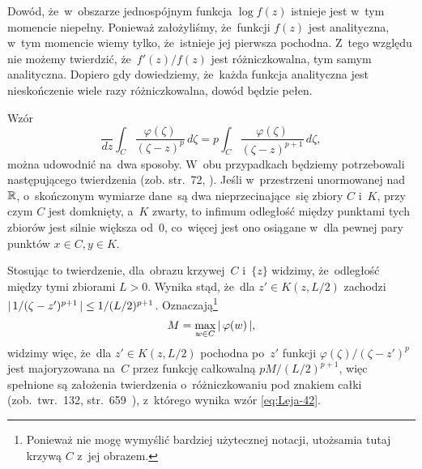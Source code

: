 \documentclass[a4paper,11pt]{article}
\begin{document}
\vspace{\spaceFour}



\start {} Dowód, że~w~obszarze jednospójnym funkcja
$\log f( z )$ istnieje jest w~tym momencie niepełny. Ponieważ
założyliśmy, że~funkcji $f( z )$ jest analityczna, w~tym momencie
wiemy tylko, że~istnieje jej pierwsza pochodna. Z~tego względu nie
możemy twierdzić, że~$f'( z ) / f( z )$ jest różniczkowalna, tym samym
analityczna. Dopiero gdy dowiedziemy, że~każda funkcja analityczna
jest nieskończenie wiele razy różniczkowalna, dowód będzie pełen.

\vspace{\spaceFour}



\start {} Wzór
\begin{equation}
  \label{eq:Leja-41}
  \frac{ }{ dz } \int_{ C } \frac{ \varphi( \zeta ) }{ ( \zeta - z )^{ p } } \, d\zeta
  = p \int_{ C } \frac{ \varphi( \zeta ) }{ ( \zeta - z )^{ p + 1 } } \, d\zeta,
\end{equation}
można udowodnić na~dwa sposoby. W~obu przypadkach będziemy
potrzebowali następującego twierdzenia (zob. str.~72,
\cite{SchwartzKursAnalizyMatematycznejVolI1979}). Jeśli w~przestrzeni
unormowanej nad~$\mathbb{R}$, o~skończonym wymiarze dane~są dwa
nieprzecinające~się zbiory $C$ i~$K$, przy czym $C$ jest domknięty,
a~$K$ zwarty, to infimum odległość między punktami tych zbiorów jest
silnie większa od~$0$, co~więcej jest ono osiągane w~dla pewnej pary
punktów $x \in C, y \in K$.

Stosując to twierdzenie, dla~obrazu krzywej~$C$ i~$\{ z \}$ widzimy,
że~odległość między tymi zbiorami $L > 0$. Wynika stąd, że~dla
$z' \in K( z, L / 2 )$ zachodzi
$|\, {  1 / ( \zeta - z' )^{ p + 1 }  } \,| \leq 1 / ( L / 2 )^{ p + 1 }$.
Oznaczają\footnote{Ponieważ nie mogę wymyślić bardziej użytecznej
  notacji, utożsamia tutaj krzywą $C$ z~jej obrazem.}
\begin{equation}
  \label{eq:Leja-42}
  M = \max_{ w \in C } |\, {  \varphi( w )  } \,|,
\end{equation}
widzimy więc, że~dla $z' \in K( z, L / 2 )$ pochodna po~$z'$ funkcji
$\varphi( \zeta ) / ( \zeta - z' )^{ p }$ jest majoryzowana na~$C$
przez funkcję całkowalną $p M / ( L / 2 )^{ p + 1 }$, więc spełnione
są założenia twierdzenia o~różniczkowaniu pod znakiem całki
(zob.~twr.~132,
str.~659~\cite{SchwartzKursAnalizyMatematycznejVolI1979}), z~którego
wynika wzór \eqref{eq:Leja-42}.
\end{document}
